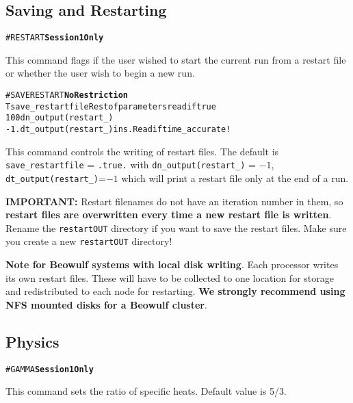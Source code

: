 \subsection{Saving and Restarting \label{section:restart}}

\begin{alltt}
#RESTART \hfill {\bf Session 1 Only}
\end{alltt}

This command flags if the user wished to start the current run from a restart 
file or whether the user wish to begin a new run.
\ \ \\

\begin{alltt}
#SAVERESTART   \hfill {\bf No Restriction}
T                      save_restartfile  Rest of parameters read if true
100                    dn_output(restart_)
-1.                    dt_output(restart_) in s. Read if time_accurate!
\end{alltt}

This command controls the writing of restart files.
The default is {\tt save\_restartfile} = {\tt .true.} with 
{\tt dn\_output(restart\_)} = $-1$, {\tt dt\_output(restart\_)}=$-1$ which
will print a restart file only at the end of a run.

{\bf IMPORTANT:} Restart filenames do not have an iteration number in them,
so {\bf restart files are overwritten every time a new restart file is
written}.  Rename the {\tt restartOUT} directory if you want to save the restart
files.  Make sure you create a new {\tt restartOUT} directory!

{\bf Note for Beowulf systems with local disk writing}.  Each processor
writes its own restart files.  These will have to be collected to one
location for storage and redistributed to each node for restarting.
{\bf We strongly recommend using NFS mounted disks for a Beowulf cluster}.


\subsection{Physics \label{section:physics}}

\begin{alltt}
#GAMMA   \hfill {\bf Session 1 Only}
\end{alltt}

This command sets the ratio of specific heats.  Default value is 5/3.
\ \ \\

